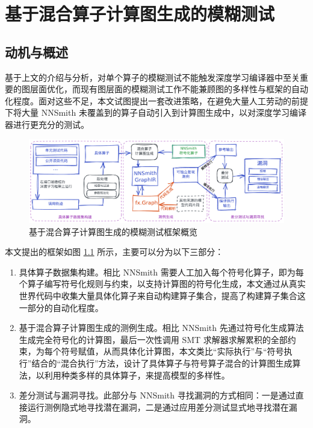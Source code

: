 
\chapter{基于混合算子计算图生成的模糊测试}
\label{chp:method}

\section{动机与概述}

基于上文的介绍与分析，对单个算子的模糊测试不能触发深度学习编译器中至关重要的图层面优化，而现有图层面的模糊测试工作不能兼顾图的多样性与框架的自动化程度。面对这些不足，本文试图提出一套改进策略，在避免大量人工劳动的前提下将大量 NNSmith 未覆盖到的算子自动引入到计算图生成中，以对深度学习编译器进行更充分的测试。

\begin{figure}
    \centering
    \includegraphics[width=1.\linewidth]{figures/overview.pdf}
    \caption{基于混合算子计算图生成的模糊测试框架概览}
    \label{fig:overview}
\end{figure}

本文提出的框架如图 \ref{fig:overview} 所示，主要可以分为以下三部分：
\begin{enumerate}
    \item 具体算子数据集构建。相比 NNSmith 需要人工加入每个符号化算子，即为每个算子编写符号化规则与约束，以支持计算图的符号化生成，本文通过从真实世界代码中收集大量具体化算子来自动构建算子集合，提高了构建算子集合这一部分的自动化程度。
    \item 基于混合算子计算图生成的测例生成。相比 NNSmith 先通过符号化生成算法生成完全符号化的计算图，最后一次性调用 SMT 求解器求解累积的全部约束，为每个符号赋值，从而具体化计算图，本文类比“实际执行”与“符号执行”结合的“混合执行”方法，设计了具体算子与符号算子混合的计算图生成算法，以利用种类多样的具体算子，来提高模型的多样性。
    \item 差分测试与漏洞寻找。此部分与 NNSmith 寻找漏洞的方式相同：一是通过直接运行测例隐式地寻找潜在漏洞，二是通过应用差分测试显式地寻找潜在漏洞。
\end{enumerate}

